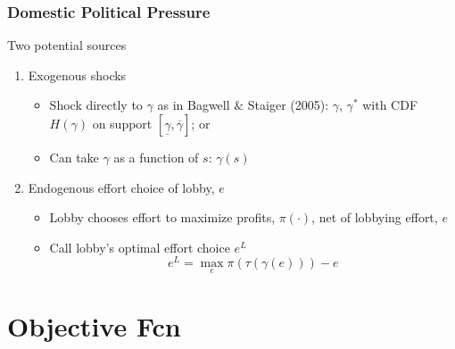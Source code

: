 \documentclass[handout]{beamer}
\newcommand{\ga}{\gamma}
\newcommand{\ov}{\overline}
\newcommand{\un}{\underline}
\begin{document}
\begin{frame}
\frametitle{Domestic Political Pressure}
Two potential sources
\pause
\begin{enumerate}[<+->]
	\item Exogenous shocks
		\begin{itemize}[<+->]
			\item Shock directly to $\ga$ as in Bagwell $\&$ Staiger (2005): $\ga$, $\ga^*$ with CDF $H(\ga)$ on support $\left[\un{\ga},\ov{\ga}\right]$; or
			\item Can take $\ga$ as a function of $s$: $\ga(s)$
		\end{itemize}
	
	\item Endogenous effort choice of lobby, $e$
		\begin{itemize}[<+->]
			\item Lobby chooses effort to maximize profits, $\pi(\cdot)$, net of lobbying effort, $e$
			\item Call lobby's optimal effort choice $e^L$
						\[
						  e^L = \max_e \pi(\tau(\ga(e))) - e
						\]
		\end{itemize}
\end{enumerate}

\end{frame}




\section{Objective Fcn}
\end{document}
